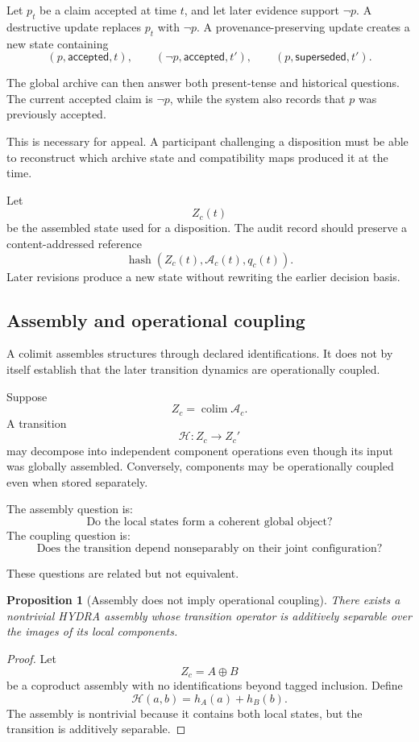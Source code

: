 \documentclass[11pt]{article}
\newtheorem{proposition}[definition]{Proposition}
\theoremstyle{definition}
\DeclareMathOperator{\colim}{colim}
\newcommand{\A}{\mathcal{A}}
\newcommand{\Hh}{\mathcal{H}}
\begin{document}
Let \(p_t\) be a claim accepted at time \(t\), and let later evidence support \(\neg p\). A destructive update replaces \(p_t\) with \(\neg p\). A provenance-preserving update creates a new state containing
\[
(p,\mathsf{accepted},t),
\qquad
(\neg p,\mathsf{accepted},t'),
\qquad
(p,\mathsf{superseded},t').
\]

The global archive can then answer both present-tense and historical questions. The current accepted claim is \(\neg p\), while the system also records that \(p\) was previously accepted.

This is necessary for appeal. A participant challenging a disposition must be able to reconstruct which archive state and compatibility maps produced it at the time.

Let
\[
Z_c(t)
\]
be the assembled state used for a disposition. The audit record should preserve a content-addressed reference
\[
\operatorname{hash}(Z_c(t),\A_c(t),q_c(t)).
\]
Later revisions produce a new state without rewriting the earlier decision basis.

\subsection{Assembly and operational coupling}

A colimit assembles structures through declared identifications. It does not by itself establish that the later transition dynamics are operationally coupled.

Suppose
\[
Z_c
=
\colim\A_c.
\]
A transition
\[
\Hh:Z_c\to Z_c'
\]
may decompose into independent component operations even though its input was globally assembled. Conversely, components may be operationally coupled even when stored separately.

The assembly question is:
\[
\text{Do the local states form a coherent global object?}
\]
The coupling question is:
\[
\text{Does the transition depend nonseparably on their joint configuration?}
\]

These questions are related but not equivalent.

\begin{proposition}[Assembly does not imply operational coupling]
There exists a nontrivial HYDRA assembly whose transition operator is additively separable over the images of its local components.
\end{proposition}

\begin{proof}
Let
\[
Z_c=A\oplus B
\]
be a coproduct assembly with no identifications beyond tagged inclusion. Define
\[
\Hh(a,b)
=
h_A(a)+h_B(b).
\]
The assembly is nontrivial because it contains both local states, but the transition is additively separable.
\end{proof}
\end{document}
